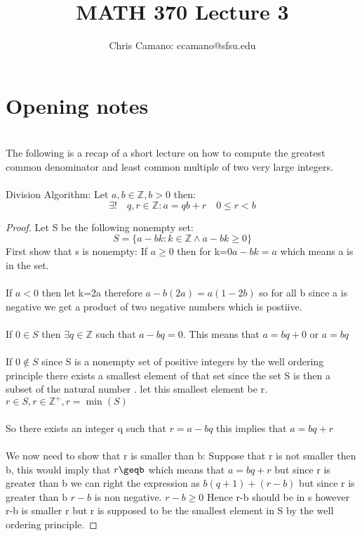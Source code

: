 \documentclass[12pt]{article}
\author{Chris Camano: ccamano@sfsu.edu}
\title{MATH 370  Lecture 3 }
\date
\newcommand{\sect}[1]{\section*{#1}}
\newcommand{\Z}{\mathbb{Z}}
\theoremstyle{definition}
\theoremstyle{remark}
\numberwithin{equation}{section}
\begin{document}
\maketitle

\sect{Opening notes}\\
The following is a recap of a short lecture on how to compute the greatest common denominator and least common multiple of two very large integers. \\\\
\thm Division Algorithm:
Let $a,b\in \Z, b>0$ then:
\[
  \exists !\quad q,r \in \Z : a=qb+r\quad 0\leq r < b
\]
\begin{proof}
  Let S be the following nonempty set:
  \[
    S=\{a-bk: k \in \Z \land a-bk \geq0\}
  \]
  First show that s is nonempty: If $a\geq 0$ then for k=0$ a-bk=a$ which means a is in the set. \\\\
  If $a<0$ then let k=2a therefore $a-b(2a)=a(1-2b)$ so for all b since a is negative we get a product of two negative numbers which is postiive. \\\\
  If $0 \in S $ then $\exists q \in \Z$ such that $a-bq=0$. This means that $a=bq+0$ or $a=bq$ \\\\
If $0 \notin S$ since S is a nonempty set of positive integers by the well ordering principle there exists a smallest element of that set since the set S is then a subset of the natural number . let this smallest element be r. $r\in S, r\in \Z^+, r=\min(S)$\\\\
So there exists an integer q such that $r=a-bq$ this implies that $a=bq+r$ \\\\
We now need to show that r is smaller than b: Suppose that r is not smaller then b, this would imply that $r\geqb$ which means that $a=bq+r$ but since r is greater than b we can right the expression as $b(q+1)+(r-b)$ but since r is greater than b $ r-b$ is non negative. $r-b \geq 0$ Hence r-b should be in s however r-b is smaller r but r is supposed to be the smallest element in S by the well ordering principle.
\end{proof}
\end{document}
